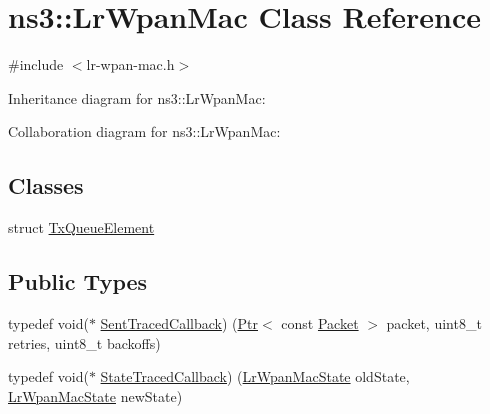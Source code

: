 \hypertarget{classns3_1_1LrWpanMac}{}\section{ns3\+:\+:Lr\+Wpan\+Mac Class Reference}
\label{classns3_1_1LrWpanMac}


{\ttfamily \#include $<$lr-\/wpan-\/mac.\+h$>$}



Inheritance diagram for ns3\+:\+:Lr\+Wpan\+Mac\+:


Collaboration diagram for ns3\+:\+:Lr\+Wpan\+Mac\+:
\subsection*{Classes}
\begin{DoxyCompactItemize}
\item 
struct \hyperlink{structns3_1_1LrWpanMac_1_1TxQueueElement}{Tx\+Queue\+Element}
\end{DoxyCompactItemize}
\subsection*{Public Types}
\begin{DoxyCompactItemize}
\item 
typedef void($\ast$ \hyperlink{classns3_1_1LrWpanMac_a64dc8b44e7aeb4e7c3bb9d0f71ed70e8}{Sent\+Traced\+Callback}) (\hyperlink{classns3_1_1Ptr}{Ptr}$<$ const \hyperlink{classns3_1_1Packet}{Packet} $>$ packet, uint8\+\_\+t retries, uint8\+\_\+t backoffs)
\item 
typedef void($\ast$ \hyperlink{classns3_1_1LrWpanMac_ad847a4537bebb10c39f656f1ebdb87f5}{State\+Traced\+Callback}) (\hyperlink{group__lr-wpan_ga02ee7efd682937a8781f5e6101f61884}{Lr\+Wpan\+Mac\+State} old\+State, \hyperlink{group__lr-wpan_ga02ee7efd682937a8781f5e6101f61884}{Lr\+Wpan\+Mac\+State} new\+State)
\end{DoxyCompactItemize}
